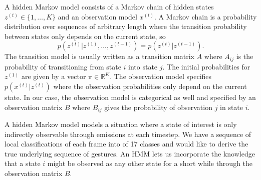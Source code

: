 
A hidden Markov model consists of a Markov chain of hidden states $z^{(t)} \in
\{ 1, \dots, K \}$ and an observation model $x^{(t)}$. A Markov chain is a
probability distribution over sequences of arbitrary length where the transition
probability between states only depends on the current state, so
\begin{equation*}
  p\left( z^{(t)} | z^{(1)}, \dots, z^{(t - 1)} \right) = p\left( z^{(t)} | z^{(t - 1)} \right).
\end{equation*}
The transition model is usually written as a transition matrix $A$ where
$A_{ij}$ is the probability of transitioning from state $i$ into state $j$. The
initial probabilities for $z^{(1)}$ are given by a vector $\pi \in
\mathbb{R}^{K}$. The observation model specifies $p(x^{(t)} | z^{(t)})$ where
the observation probabilities only depend on the current state. In our case, the
observation model is categorical as well and specified by an observation matrix
$B$ where $B_{ij}$ gives the probability of observation $j$ in state $i$. 

A hidden Markov model models a situation where a state of interest is only
indirectly observable through emissions at each timestep. We have a sequence of
local classifications of each frame into of 17 classes and would like to derive
the true underlying sequence of gestures. An HMM lets us incorporate the
knowledge that a state $i$ might be observed as any other state for a short
while through the observation matrix $B$.

